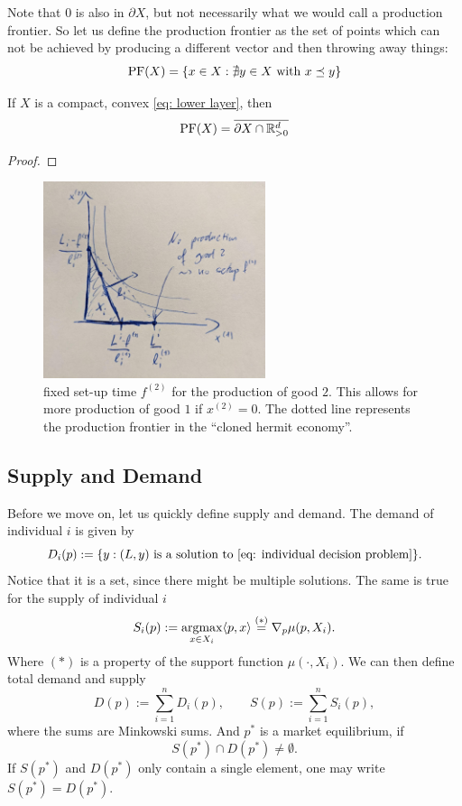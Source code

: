 Note that \(0\) is also in \(\partial X\), but not necessarily what we would
call a production frontier. So let us define the production frontier as the set
of points which can not be achieved by producing a different vector and then
throwing away things:
\[
	\operatorname{PF}(X) = \{ x\in X : \nexists y\in X \text{ with } x\preceq y\}
\]
\begin{lemma}
	If \(X\) is a compact, convex \ref{eq: lower layer}, then
	\[
		\operatorname{PF}(X) = \overline{\partial X \cap \mathbb{R}_{>0}^d}
	\]
\end{lemma}
\begin{proof}
	
\end{proof}


\begin{example*}

\end{example*}

\begin{figure}
	\includegraphics[width=0.58\textwidth]{images/hermit-decision-setup-cost.jpeg}
	\caption{
	fixed set-up time \(f^{(2)}\) for the production of good \(2\). This allows
	for more production of good \(1\) if \(x^{(2)}=0\). The dotted line
	represents the production frontier in the ``cloned hermit economy''.}
\end{figure}

\subsection{Supply and Demand}

Before we move on, let us quickly define supply and demand. The demand of
individual \(i\) is given by
\[
	D_i(p) := \{
		y : (L,y)
		\text{ is a solution to \eqref{eq: individual decision problem}}
	\}.
\]
Notice that it is a set, since there might be multiple solutions. The same is
true for the supply of individual \(i\)
\[
	S_i(p) := \operatorname*{argmax}_{x\in X_i} \langle p, x\rangle 
	\overset{(*)}= \nabla_p \mu(p, X_i).
\]
Where \((*)\) is a property of the support function \(\mu(\cdot,
X_i)\).
We can then define total demand and supply
\[
	D(p) := \sum_{i=1}^n D_i(p),
	\qquad
	S(p) := \sum_{i=1}^n S_i(p),
\]
where the sums are Minkowski sums.
And \(p^*\) is a market equilibrium, if
\[
	S(p^*)\cap D(p^*)\neq\emptyset.
\]
If \(S(p^*)\) and \(D(p^*)\) only contain a single element, one may write
\(S(p^*)=D(p^*)\).